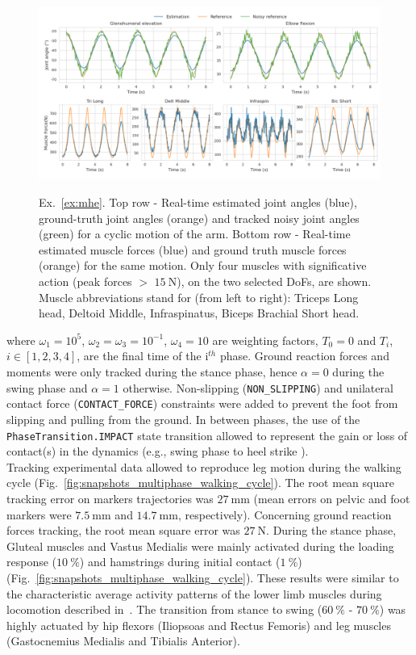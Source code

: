 \begin{figure}[t!] 
\centering 
\includegraphics[width=\textwidth]{figures/MHE_results.pdf}\\
\caption{Ex.~\ref{ex:mhe}. Top row - Real-time estimated joint angles (blue), ground-truth joint angles (orange) and tracked noisy joint angles (green) for a cyclic motion of the arm.
Bottom row - Real-time estimated muscle forces (blue) and ground truth muscle forces (orange) for the same motion.
Only four muscles with significative action (peak forces $>$ $\SI{15}{\newton}$), on the two selected DoFs, are shown.
Muscle abbreviations stand for (from left to right): Triceps Long head, Deltoid Middle, Infraspinatus, Biceps Brachial Short head.} 
\label{fig:MHE_results}
\end{figure} 
\noindent where $\omega_1=10^5$, $\omega_2=\omega_3=10^{-1}$, $\omega_4=10$ are weighting factors, $T_0=0$ and $T_i$, $i \in [1, 2, 3, 4]$, are the final time of the i$^{th}$ phase. 
Ground reaction forces and moments were only tracked during the stance phase, hence $\alpha = 0$ during the swing phase and $\alpha = 1$ otherwise. 
Non-slipping (\texttt{NON\_SLIPPING}) and unilateral contact force (\texttt{CONTACT\_FORCE}) constraints were added to prevent the foot from slipping and pulling from the ground. 
In between phases, the use of the \texttt{PhaseTransition.IMPACT} state transition allowed to represent the gain or loss of contact(s) in the dynamics (e.g., \cite{felis_synthesis_2016} swing phase to heel strike ).\\
Tracking experimental data allowed to reproduce leg motion during the walking cycle (Fig.~\ref{fig:snapshots_multiphase_walking_cycle}). 
The root mean square tracking error on markers trajectories was $\SI{27}{\milli\meter}$ (mean errors on pelvic and foot markers were $\SI{7.5}{\milli\meter}$ and $\SI{14.7}{\milli\meter}$, respectively). 
Concerning ground reaction forces tracking, the root mean square error was $\SI{27}{\newton}$.
During the stance phase, Gluteal muscles and Vastus Medialis were mainly activated during the loading response ($\SI{10}{\percent}$) and hamstrings during initial contact ($\SI{1}{\percent}$) (Fig.~\ref{fig:snapshots_multiphase_walking_cycle}). 
These results were similar to the characteristic average activity patterns of the lower limb muscles during locomotion described in~\cite{winter_biomechanics_1991}. 
The transition from stance to swing ($\SI{60}{\percent}$ - $\SI{70}{\percent}$) was highly actuated by hip flexors (Iliopsoas and Rectus Femoris) and leg muscles (Gastocnemius Medialis and Tibialis Anterior).

